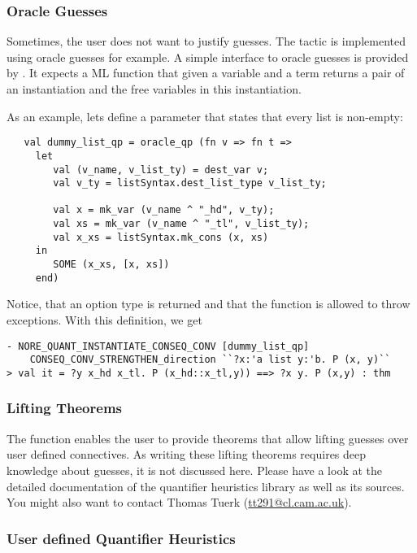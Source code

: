 \subsubsection{Oracle Guesses}

Sometimes, the user does not want to justify guesses. The tactic
 is implemented using oracle guesses for example.
A simple interface to oracle guesses is provided by .
It expects a ML function that given a variable and a term returns
a pair of an instantiation and the free variables in this instantiation.

As an example, lets define a parameter that states that every list is non-empty:
\begin{verbatim}
   val dummy_list_qp = oracle_qp (fn v => fn t =>
     let
        val (v_name, v_list_ty) = dest_var v;
        val v_ty = listSyntax.dest_list_type v_list_ty;

        val x = mk_var (v_name ^ "_hd", v_ty);
        val xs = mk_var (v_name ^ "_tl", v_list_ty);
        val x_xs = listSyntax.mk_cons (x, xs)
     in
        SOME (x_xs, [x, xs])
     end)
\end{verbatim}

\noindent
Notice, that an option type is returned and that the function is
allowed to throw  exceptions.
With this definition, we get

\begin{session}
\begin{verbatim}
- NORE_QUANT_INSTANTIATE_CONSEQ_CONV [dummy_list_qp]
    CONSEQ_CONV_STRENGTHEN_direction ``?x:'a list y:'b. P (x, y)``
> val it = ?y x_hd x_tl. P (x_hd::x_tl,y)) ==> ?x y. P (x,y) : thm
\end{verbatim}
\end{session}

\subsubsection{Lifting Theorems}

The function  enables the
user to provide theorems that allow lifting guesses over
user defined connectives. As writing these lifting theorems requires
deep knowledge about guesses, it is not discussed here. Please have a
look at the detailed documentation of the quantifier heuristics library as
well as its sources. You might also want to contact
Thomas Tuerk (\url{tt291@cl.cam.ac.uk}).


\subsubsection{User defined Quantifier Heuristics}

